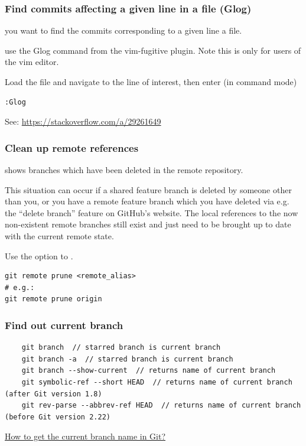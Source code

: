 \documentclass{git_course}
\begin{document}
\begin{frame}[fragile]
    \frametitle{Find commits affecting a given line in a file (Glog)}

     you want to find the commits corresponding to a given
    line a file.

     use the Glog command from the vim-fugitive plugin.  Note
    this is only for users of the vim editor.

    Load the file and navigate to the line of interest, then enter (in
    command mode)
\begin{lstlisting}
:Glog
\end{lstlisting}

    See: \url{https://stackoverflow.com/a/29261649}
\end{frame}

\begin{frame}[fragile]
    \frametitle{Clean up remote references}

      shows branches which have been
    deleted in the remote repository.

    This situation can occur if a shared feature branch is deleted by
    someone other than you, or you have a remote feature branch which you
    have deleted via e.g. the ``delete branch'' feature on GitHub's website.
    The local references to the now non-existent remote branches still exist
    and just need to be brought up to date with the current remote state.

     Use the  option to .

\begin{lstlisting}
git remote prune <remote_alias>
# e.g.:
git remote prune origin
\end{lstlisting}
\end{frame}

\begin{frame}[fragile]
    \frametitle{Find out current branch}
    \begin{lstlisting}
    git branch  // starred branch is current branch
    git branch -a  // starred branch is current branch
    git branch --show-current  // returns name of current branch
    git symbolic-ref --short HEAD  // returns name of current branch (after Git version 1.8)
    git rev-parse --abbrev-ref HEAD  // returns name of current branch (before Git version 2.22)
    \end{lstlisting}
    \href{https://stackoverflow.com/questions/6245570/how-to-get-the-current-branch-name-in-git}{How to get the current branch name in Git?}
\end{frame}
\end{document}
